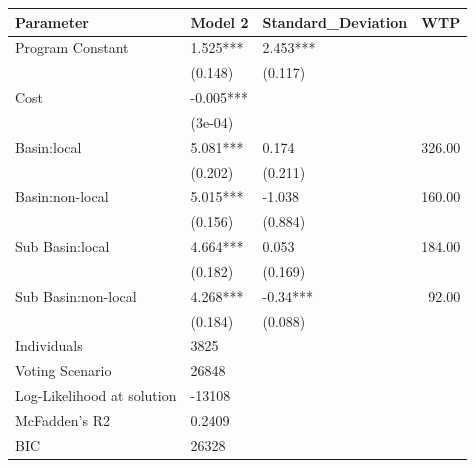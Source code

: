\begin{table}[ht]
\centering
\begin{tabular}{lllr}
  \hline
Parameter & Model 2 & Standard\_Deviation & WTP \\ 
  \hline
Program Constant & 1.525*** & 2.453*** &  \\ 
   & (0.148) & (0.117) &  \\ 
  Cost & -0.005*** &  &  \\ 
   & (3e-04) &  &  \\ 
  Basin:local & 5.081*** & 0.174 & 326.00 \\ 
   & (0.202) & (0.211) &  \\ 
  Basin:non-local & 5.015*** & -1.038 & 160.00 \\ 
   & (0.156) & (0.884) &  \\ 
  Sub Basin:local & 4.664*** & 0.053 & 184.00 \\ 
   & (0.182) & (0.169) &  \\ 
  Sub Basin:non-local & 4.268*** & -0.34*** & 92.00 \\ 
   & (0.184) & (0.088) &  \\ 
  Individuals & 3825 &  &  \\ 
  Voting Scenario & 26848 &  &  \\ 
  Log-Likelihood at solution & -13108 &  &  \\ 
  McFadden’s R2 & 0.2409 &  &  \\ 
  BIC & 26328 &  &  \\ 
   \hline
\end{tabular}
\end{table}
